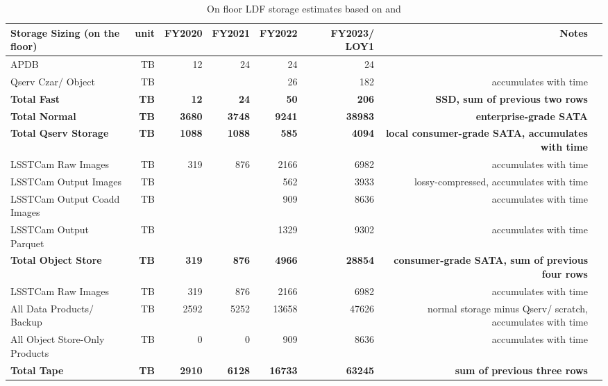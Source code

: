 \tiny \begin{longtable} { |p{}  |r  |r  |r  |r  |r  |r  |r |} 
\caption{On floor LDF storage estimates based on  and 
 \label{tab:storageFloor}}\\ 
\hline 
\textbf{Storage Sizing (on the floor)}&\textbf{unit}&\textbf{FY2020}&\textbf{FY2021}&\textbf{FY2022}&\textbf{FY2023/ LOY1}&\textbf{Notes} \\ \hline
{APDB}&{TB}&{12}&{24}&{24}&{24}& \\ \hline
{Qserv Czar/ Object}&{TB}&{}&{}&{26}&{182}&{accumulates with time} \\ \hline
\textbf{Total Fast}&\textbf{TB}&\textbf{12}&\textbf{24}&\textbf{50}&\textbf{206}&\textbf{SSD, sum of previous two rows} \\ \hline
\textbf{Total Normal}&\textbf{TB}&\textbf{3680}&\textbf{3748}&\textbf{9241}&\textbf{38983}&\textbf{enterprise-grade SATA} \\ \hline
\textbf{Total Qserv Storage}&\textbf{TB}&\textbf{1088}&\textbf{1088}&\textbf{585}&\textbf{4094}&\textbf{local consumer-grade SATA, accumulates with time} \\ \hline
{LSSTCam Raw Images}&{TB}&{319}&{876}&{2166}&{6982}&{accumulates with time} \\ \hline
{LSSTCam Output Images}&{TB}&{}&{}&{562}&{3933}&{lossy-compressed, accumulates with time} \\ \hline
{LSSTCam Output Coadd Images}&{TB}&{}&{}&{909}&{8636}&{accumulates with time} \\ \hline
{LSSTCam Output Parquet}&{TB}&{}&{}&{1329}&{9302}&{accumulates with time} \\ \hline
\textbf{Total Object Store}&\textbf{TB}&\textbf{319}&\textbf{876}&\textbf{4966}&\textbf{28854}&\textbf{consumer-grade SATA, sum of previous four rows} \\ \hline
{LSSTCam Raw Images}&{TB}&{319}&{876}&{2166}&{6982}&{accumulates with time} \\ \hline
{All Data Products/ Backup}&{TB}&{2592}&{5252}&{13658}&{47626}&{normal storage minus Qserv/ scratch, accumulates with time} \\ \hline
{All Object Store-Only Products}&{TB}&{0}&{0}&{909}&{8636}&{accumulates with time} \\ \hline
\textbf{Total Tape}&\textbf{TB}&\textbf{2910}&\textbf{6128}&\textbf{16733}&\textbf{63245}&\textbf{sum of previous three rows} \\ \hline
\end{longtable} \normalsize
